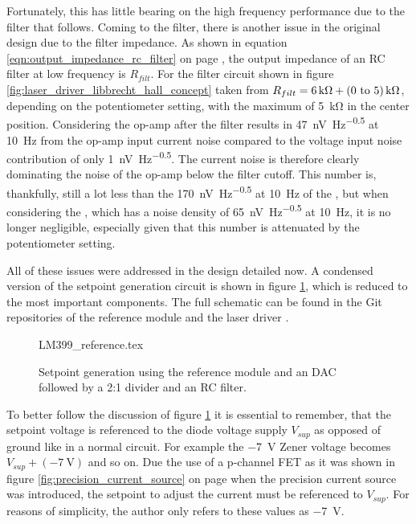 Fortunately, this has little bearing on the high frequency performance due to the filter that follows. Coming to the filter, there is another issue in the original design due to the filter impedance. As shown in equation \ref{eqn:output_impedance_rc_filter} on page \pageref{eqn:output_impedance_rc_filter}, the output impedance of an RC filter at low frequency is $R_{filt}$. For the filter circuit shown in figure \ref{fig:laser_driver_libbrecht_hall_concept} taken from \cite{libbrecht_hall} $R_{filt} = \qty{6}{\kilo\ohm} + \qtyrange[range-units = bracket, range-phrase=\textup{~to~}]{0}{5}{\kilo\ohm}$, depending on the potentiometer setting, with the maximum of \qty{5}{\kilo \ohm} in the center position. Considering the  op-amp after the filter results in \qty[power-half-as-sqrt]{47}{\nV \per \Hz\tothe{0.5}} at \qty{10}{\Hz} from the op-amp input current noise compared to the voltage input noise contribution of only \qty[power-half-as-sqrt]{1}{\nV \per \Hz\tothe{0.5}}. The current noise is therefore clearly dominating the noise of the op-amp below the filter cutoff. This number is, thankfully, still a lot less than the \qty[power-half-as-sqrt]{170}{\nV \per \Hz\tothe{0.5}} at \qty{10}{\Hz} of the , but when considering the , which has a noise density of \qty[power-half-as-sqrt]{65}{\nV \per \Hz\tothe{0.5}} at \qty{10}{\Hz}, it is no longer negligible, especially given that this number is attenuated by the potentiometer setting.

All of these issues were addressed in the design detailed now. A condensed version of the setpoint generation circuit is shown in figure \ref{fig:dgDrive_setpoint_generation}, which is reduced to the most important components. The full schematic can be found in the Git repositories of the reference module and the laser driver \cite{git_dgDrive,git_dgDrive_reference}.
\begin{figure}[ht]
    \centering
        {LM399_reference.tex}
    \caption{Setpoint generation using the  reference module and an  DAC followed by a 2:1 divider and an RC filter.}
    \label{fig:dgDrive_setpoint_generation}
\end{figure}

To better follow the discussion of figure \ref{fig:dgDrive_setpoint_generation} it is essential to remember, that the setpoint voltage is referenced to the diode voltage supply $V_{sup}$ as opposed of ground like in a normal circuit. For example the \qty{-7}{\V} Zener voltage becomes $V_{sup} + (\qty{-7}{\V})$ and so on. Due the use of a p-channel FET as it was shown in figure \ref{fig:precision_current_source} on page \pageref{fig:precision_current_source} when the precision current source was introduced, the setpoint to adjust the current must be referenced to $V_{sup}$. For reasons of simplicity, the author only refers to these values as \qty{-7}{\V}.

